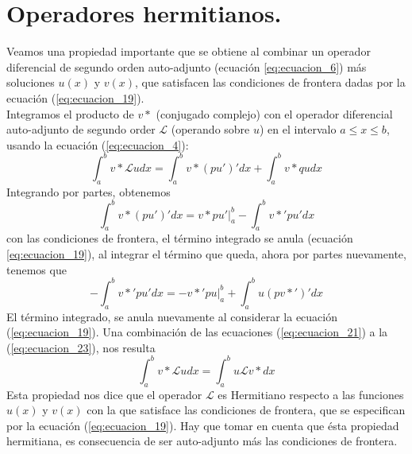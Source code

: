 \section{Operadores hermitianos.}
Veamos una propiedad importante que se obtiene al combinar un operador diferencial de segundo orden auto-adjunto (ecuación \ref{eq:ecuacion_6}) más soluciones $u(x)$ y $v(x)$, que satisfacen las condiciones de frontera dadas por la ecuación (\ref{eq:ecuacion_19}).
\\
Integramos el producto de $v*$ (conjugado complejo) con el operador diferencial auto-adjunto de segundo order $\mathscr{L}$ (operando sobre $u$) en el intervalo $a \leq x \leq b$, usando la ecuación (\ref{eq:ecuacion_4}):
\begin{equation}
\int_{a}^{b} v* \mathscr{L} u dx = \int_{a}^{b} v* (pu')' dx + \int_{a}^{b} v* qu dx
\label{eq:ecuacion_21}
\end{equation}
Integrando por partes, obtenemos
\begin{equation}
\int_{a}^{b} v*(pu')' dx = v* pu' \bigg\vert_{a}^{b} - \int_{a}^{b} v*' pu' dx
\label{eq:ecuacion_22}
\end{equation}
con las condiciones de frontera, el término integrado se anula (ecuación \ref{eq:ecuacion_19}), al integrar el término que queda, ahora por partes nuevamente, tenemos que
\begin{equation}
- \int_{a}^{b} v*' pu' dx = - v*' pu \bigg\vert_{a}^{b} + \int_{a}^{b} u(pv*')' dx
\label{eq:ecuacion_23}
\end{equation}
El término integrado, se anula nuevamente al considerar la ecuación (\ref{eq:ecuacion_19}). Una combinación de las ecuaciones (\ref{eq:ecuacion_21}) a la (\ref{eq:ecuacion_23}), nos resulta
\begin{equation}
\int_{a}^{b} v* \mathscr{L} u dx = \int_{a}^{b} u \mathscr{L} v* dx
\label{eq:ecuacion_24}
\end{equation}
Esta propiedad nos dice que el operador $\mathscr{L}$ es Hermitiano respecto a las funciones $u(x)$ y $v(x)$ con la que satisface las condiciones de frontera, que se especifican por la ecuación (\ref{eq:ecuacion_19}). Hay que tomar en cuenta que ésta propiedad hermitiana, es consecuencia de ser auto-adjunto más las condiciones de frontera.

